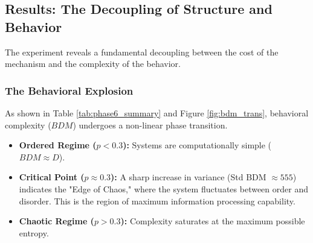 \documentclass[11pt]{article}
\begin{document}
\subsection{Results: The Decoupling of Structure and Behavior}
The experiment reveals a fundamental decoupling between the cost of the mechanism and the complexity of the behavior.

\begin{table}[H]
\centering
\caption{Phase 6 Summary: The Algorithmic Phase Transition ($N=20$)}
\label{tab:phase6_summary}
\end{table}

\subsubsection{The Behavioral Explosion}
As shown in Table \ref{tab:phase6_summary} and Figure \ref{fig:bdm_trans}, behavioral complexity ($BDM$) undergoes a non-linear phase transition.
\begin{itemize}
    \item \textbf{Ordered Regime ($p < 0.3$):} Systems are computationally simple ($BDM \approx D$).
    \item \textbf{Critical Point ($p \approx 0.3$):} A sharp increase in variance (Std BDM $\approx 555$) indicates the "Edge of Chaos," where the system fluctuates between order and disorder. This is the region of maximum information processing capability.
    \item \textbf{Chaotic Regime ($p > 0.3$):} Complexity saturates at the maximum possible entropy.
\end{itemize}
\end{document}
